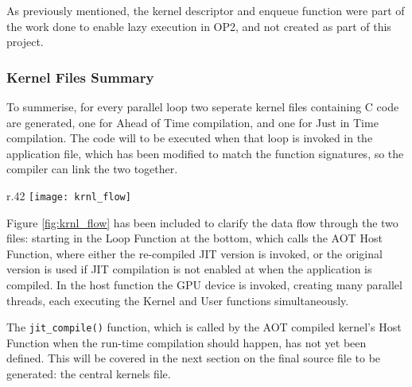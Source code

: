 As previously mentioned, the kernel descriptor and enqueue function were part of the work done to enable lazy execution in OP2, and not created as part of this project.

\clearpage

\subsubsection{Kernel Files Summary}
\label{impl_summary}

To summerise, for every parallel loop two seperate kernel files containing C code are generated, one for Ahead of Time compilation, and one for Just in Time compilation. The code will to be executed when that loop is invoked in the application file, which has been modified to match the function signatures, so the compiler can link the two together.

\begin{wrapfigure}{r}{.42\textwidth}
  \centering
  \texttt{[image: krnl\_flow]}
  \caption{Kernel Flow}
  \label{fig:krnl_flow}
\end{wrapfigure}

Figure \ref{fig:krnl_flow} has been included to clarify the data flow through the two files: starting in the Loop Function at the bottom, which calls the AOT Host Function, where either the re-compiled JIT version is invoked, or the original version is used if JIT compilation is not enabled at when the application is compiled. In the host function the GPU device is invoked, creating many parallel threads, each executing the Kernel and User functions simultaneously.

The \verb|jit_compile()| function, which is called by the AOT compiled kernel's Host Function when the run-time compilation should happen, has not yet been defined. This will be covered in the next section on the final source file to be generated: the central kernels file.
\clearpage
